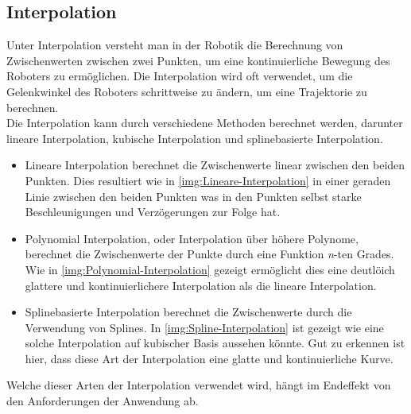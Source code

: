 \subsection{Interpolation}\label{subsec:Interpolation}
Unter Interpolation versteht man in der Robotik die Berechnung von Zwischenwerten zwischen zwei Punkten, um eine kontinuierliche Bewegung des Roboters zu ermöglichen. Die Interpolation wird oft verwendet, um die Gelenkwinkel des Roboters schrittweise zu ändern, um eine Trajektorie zu berechnen.\\
Die Interpolation kann durch verschiedene Methoden berechnet werden, darunter lineare Interpolation, kubische Interpolation und splinebasierte Interpolation.
\begin{itemize}
    \item Lineare Interpolation berechnet die Zwischenwerte linear zwischen den beiden Punkten. Dies resultiert wie in \autoref{img:Lineare-Interpolation} in einer geraden Linie zwischen den beiden Punkten was in den Punkten selbst starke Beschleunigungen und Verzögerungen zur Folge hat.
    \item Polynomial Interpolation, oder Interpolation über höhere Polynome, berechnet die Zwischenwerte der Punkte durch eine Funktion \textit{n}-ten Grades. Wie in \autoref{img:Polynomial-Interpolation} gezeigt ermöglicht dies eine deutlöich glattere und kontinuierlichere Interpolation als die lineare Interpolation.
    \item Splinebasierte Interpolation berechnet die Zwischenwerte durch die Verwendung von Splines. In \autoref{img:Spline-Interpolation} ist gezeigt wie eine solche Interpolation auf kubischer Basis aussehen könnte. Gut zu erkennen ist hier, dass diese Art der Interpolation eine glatte und kontinuierliche Kurve.
\end{itemize}
Welche dieser Arten der Interpolation verwendet wird, hängt im Endeffekt von den Anforderungen der Anwendung ab.\\

